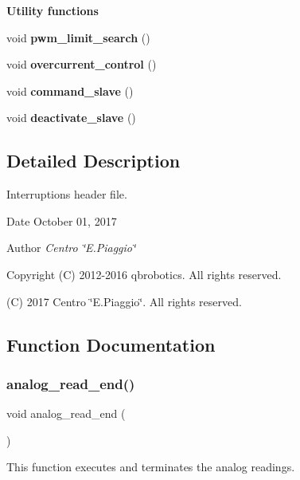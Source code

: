 \begin{Indent}\textbf{ Utility functions}\par
\begin{DoxyCompactItemize}
\item 
void \textbf{ pwm\+\_\+limit\+\_\+search} ()
\item 
void \textbf{ overcurrent\+\_\+control} ()
\item 
void \textbf{ command\+\_\+slave} ()
\item 
void \textbf{ deactivate\+\_\+slave} ()
\end{DoxyCompactItemize}
\end{Indent}


\subsection{Detailed Description}
Interruptions header file. 

\begin{DoxyDate}{Date}
October 01, 2017 
\end{DoxyDate}
\begin{DoxyAuthor}{Author}
{\itshape Centro \char`\"{}\+E.\+Piaggio\char`\"{}} 
\end{DoxyAuthor}
\begin{DoxyCopyright}{Copyright}
(C) 2012-\/2016 qbrobotics. All rights reserved. 

(C) 2017 Centro \char`\"{}\+E.\+Piaggio\char`\"{}. All rights reserved. 
\end{DoxyCopyright}


\subsection{Function Documentation}
\mbox{\label{interruptions_8h_a00a8d34962a63161405e5d7785b9625e}} 
\subsubsection{analog\+\_\+read\+\_\+end()}
{\footnotesize\ttfamily void analog\+\_\+read\+\_\+end (\begin{DoxyParamCaption}{ }\end{DoxyParamCaption})}

This function executes and terminates the analog readings. \mbox{\label{interruptions_8h_a8e10d86a40e34fc094b817f8e40b30e0}} 
